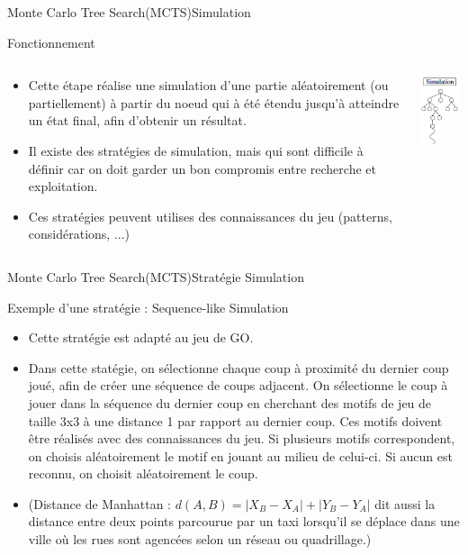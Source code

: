 \begin{frame}{Monte Carlo Tree Search(MCTS)}{Simulation}
	\begin{block}{Fonctionnement}
		\begin{columns}
			\begin{column}{7cm}
				\begin{itemize}
					\item Cette étape réalise une simulation d'une partie aléatoirement (ou partiellement) à partir du noeud qui à été étendu jusqu'à atteindre un état final, afin d'obtenir un résultat.
					\item Il existe des stratégies de simulation, mais qui sont difficile à définir car on doit garder un bon compromis entre recherche et exploitation.
					\item Ces stratégies peuvent utilises des connaissances du jeu (patterns, considérations, ...)
				\end{itemize}
			\end{column}
			\begin{column}{4cm}
				\includegraphics[width=3cm]{ressources/Simulation.png}
			\end{column}
		\end{columns}
	\end{block}
\end{frame}

\begin{frame}{Monte Carlo Tree Search(MCTS)}{Stratégie Simulation}
	\begin{block}{Exemple d'une stratégie : Sequence-like Simulation}
		\begin{itemize}
			\item Cette stratégie est adapté au jeu de GO.
			\item Dans cette statégie, on sélectionne chaque coup à proximité du dernier coup joué, afin de créer une séquence de coups adjacent. On sélectionne le coup à jouer dans la séquence du dernier coup en cherchant des motifs de jeu de taille 3x3 à une distance 1 par rapport au dernier coup. Ces motifs doivent être réalisés avec des connaissances du jeu. Si plusieurs motifs correspondent, on choisis aléatoirement le motif en jouant au milieu de celui-ci. Si aucun est reconnu, on choisit aléatoirement le coup.
			\item (Distance de Manhattan : $d(A,B) = |X_{B} - X_{A}| + |Y_{B} - Y_{A}|$ dit aussi la distance entre deux points parcourue par un taxi lorsqu'il se déplace dans une ville où les rues sont agencées selon un réseau ou quadrillage.)
		\end{itemize}
	\end{block}
\end{frame}

